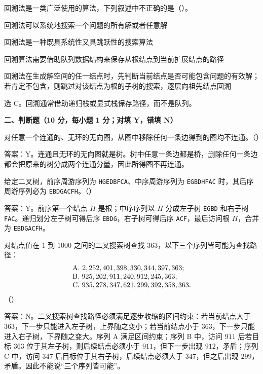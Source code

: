 \begin{question}
回溯法是一类广泛使用的算法，下列叙述中不正确的是（\quad）。
\begin{choiceoptions}[2]
  \item 回溯法可以系统地搜索一个问题的所有解或者任意解
  \item 回溯法是一种既具系统性又具跳跃性的搜索算法
  \item 回溯算法需要借助队列数据结构来保存从根结点到当前扩展结点的路径
  \item 回溯法在生成解空间的任一结点时，先判断当前结点是否可能包含问题的有效解；若肯定不包含，则跳过对该结点为根的子树的搜索，逐层向祖先结点回溯
\end{choiceoptions}
\begin{solution}
选 C。回溯通常借助递归栈或显式栈保存路径，而不是队列。
\end{solution}
\end{question}


\textbf{二、判断题（10 分，每小题 1 分；对填 Y，错填 N）}

\begin{question}
对任意一个连通的、无环的无向图，从图中移除任何一条边得到的图均不连通。（\quad）
\begin{solution}
答案：Y。连通且无环的无向图就是树。树中任意一条边都是桥，删除任何一条边都会把原来的树分成两个连通分量，因此所得图不再连通。
\end{solution}
\end{question}

\begin{question}
给定二叉树，前序周游序列为 \texttt{HGEDBFCA}、中序周游序列为 \texttt{EGBDHFAC} 时，其后序周游序列必为 \texttt{EBDGACFH}。（\quad）
\begin{solution}
答案：Y。前序第一个结点 $H$ 是根；中序序列以 $H$ 分成左子树 \texttt{EGBD} 和右子树 \texttt{FAC}。递归划分左子树可得后序 \texttt{EBDG}，右子树可得后序 \texttt{ACF}，最后访问根 $H$，合并为 \texttt{EBDGACFH}。
\end{solution}
\end{question}

\begin{question}
对结点值在 $1$ 到 $1000$ 之间的二叉搜索树查找 $363$，以下三个序列皆可能为查找路径：
\[
\begin{array}{@{}l@{}}
\text{A}.\ 2,252,401,398,330,344,397,363;\\
\text{B}.\ 925,202,911,240,912,245,363;\\
\text{C}.\ 935,278,347,621,299,392,358,363.
\end{array}
\]
（\quad）
\begin{solution}
答案：N。二叉搜索树查找路径必须满足逐步收缩的区间约束：若当前结点大于 $363$，下一步只能进入左子树，上界随之变小；若当前结点小于 $363$，下一步只能进入右子树，下界随之变大。序列 A 满足区间约束；序列 B 中，访问 $911$ 后若目标 $363$ 位于其左子树，则后续结点必须小于 $911$，但下一步出现 $912$，矛盾；序列 C 中，访问 $347$ 后目标位于其右子树，后续结点必须大于 $347$，但之后出现 $299$，矛盾。因此不能说“三个序列皆可能”。
\end{solution}
\end{question}

